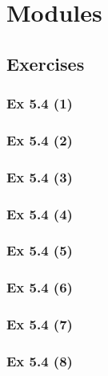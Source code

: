 \newpage		%

\section{Modules}\label{sec:5.4}
\subsection{Exercises}\label{sec:5.4_Exercises}

\subsubsection{Ex 5.4 (1)}\label{sec:Ex_5.4.1}

\subsubsection{Ex 5.4 (2)}\label{sec:Ex_5.4.2}

\subsubsection{Ex 5.4 (3)}\label{sec:Ex_5.4.3}

\subsubsection{Ex 5.4 (4)}\label{sec:Ex_5.4.4}

\subsubsection{Ex 5.4 (5)}\label{sec:Ex_5.4.5}

\subsubsection{Ex 5.4 (6)}\label{sec:Ex_5.4.6}

\subsubsection{Ex 5.4 (7)}\label{sec:Ex_5.4.7}

\subsubsection{Ex 5.4 (8)}\label{sec:Ex_5.4.8}

